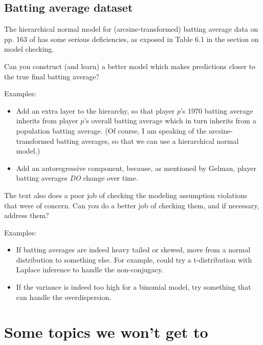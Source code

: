 \documentclass{article} %
\begin{document}
\subsection{Batting average dataset}

The hierarchical normal model for (arcsine-transformed) batting average data on pp.  163 of \cite{gelman2013bayesian} has some serious deficiencies,  as exposed in Table 6.1 in the section on model checking.    

Can you construct (and learn) a better model which makes predictions closer to the true final batting average?
 
Examples:
\begin{itemize}
\item Add an extra layer to the hierarchy,  so that player $p$'s 1970 batting average inherits from player $p$'s overall batting average which in turn inherits from a population batting average.  (Of course,  I am speaking of the arcsine-transformed batting averages,  so that we can use a hierarchical normal model.)
\item Add an autoregressive component, because,  as mentioned by Gelman,  player batting averages \textit{DO} change over time. 
\end{itemize}

The text also does a poor job of checking the modeling assumption violations that were of concern.   Can you do a better job of checking them,  and if necessary,  address them?

Examples:
\begin{itemize}
\item If batting averages are indeed heavy tailed or skewed,  move from a normal distribution to something else.   For example,  could try a t-distribution with Laplace inference to handle the non-conjugacy. 
\item If the variance is indeed too high for a binomial model,  try something that can handle the overdispersion. 
\end{itemize}

\section{Some topics we won't get to}
\end{document}
